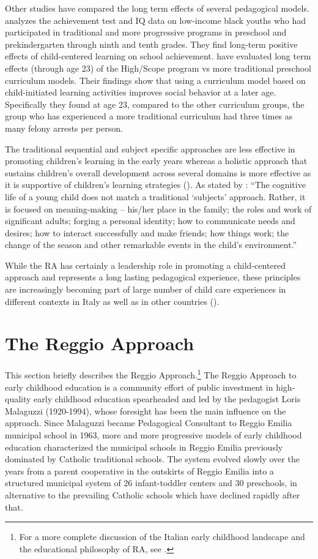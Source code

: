 \documentclass[12pt]{article}
\begin{document}
Other studies have compared the long term effects of several pedagogical models. \cite{Miller1984a} analyzes the achievement test and IQ data on low-income black youths who had participated in traditional and more progressive programs in preschool and prekindergarten through ninth and tenth grades. They find long-term positive effects of child-centered learning on school achievement. \cite{Schweinhart1997} have evaluated long term effects (through age 23) of the High/Scope program vs more traditional preschool curriculum models. Their findings show that using a curriculum model based on child-initiated learning activities improves social behavior at a later age. Specifically they found at age 23, compared to the other curriculum groups, the group who has experienced a more traditional curriculum had three times as many felony arrests per person.

The traditional sequential and subject specific approaches are less effective in promoting children's learning in the early years whereas a holistic approach that sustains children's overall development across several domains is more effective as it is supportive of children's learning strategies (\cite{Bennett2012}). As stated by \cite{Bennett2013}: ``The cognitive life of a young child does not match a traditional `subjects' approach. Rather, it is focused on meaning-making -- his/her place in the family; the roles and work of significant adults; forging a personal identity; how to communicate needs and desires; how to interact successfully and make friends; how things work; the change of the season and other remarkable events in the child's environment.''

While the RA has certainly a leadership role in promoting a child-centered approach and represents a long lasting pedagogical experience, these principles are increasingly becoming part of large number of child care experiences in different contexts in Italy as well as in other countries (\cite{Lazzari2012}).

\section{The Reggio Approach} \label{sec:RA}
This section briefly describes the Reggio Approach.\footnote{For a more complete discussion of the Italian early childhood landscape and the educational philosophy of RA, see \citet{biroli2015evaluating}.} The Reggio Approach to early childhood education is a community effort of public investment in high-quality early childhood education spearheaded and led by the pedagogist Loris Malaguzzi (1920-1994), whose foresight has been the main influence on the approach. Since Malaguzzi became Pedagogical Consultant to Reggio Emilia municipal school in 1963, more and more progressive models of early childhood education characterized the municipal schools in Reggio Emilia previously dominated by Catholic traditional schools. The system evolved slowly over the years from a parent cooperative in the outskirts of Reggio Emilia into a structured municipal system of 26 infant-toddler centers and 30 preschools, in alternative to the prevailing Catholic schools which have declined rapidly after that.
\end{document}
